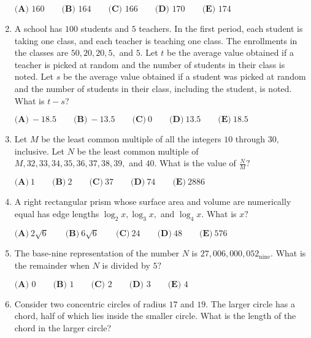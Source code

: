 \documentclass{article}
\begin{document}
\begin{enumerate}[label=\arabic*., itemsep=0.5em]
$\textbf{(A) }160\qquad\textbf{(B) }164\qquad\textbf{(C) }166\qquad\textbf{(D) }170\qquad\textbf{(E) }174$\par \vspace{0.5em}\item A school has $100$ students and $5$ teachers. In the first period, each student is taking one class, and each teacher is teaching one class. The enrollments in the classes are $50, 20, 20, 5, $ and $5$. Let $t$ be the average value obtained if a teacher is picked at random and the number of students in their class is noted. Let $s$ be the average value obtained if a student was picked at random and the number of students in their class, including the student, is noted. What is $t-s$?

$\textbf{(A)}\ {-}18.5  \qquad\textbf{(B)}\ {-}13.5 \qquad\textbf{(C)}\ 0 \qquad\textbf{(D)}\ 13.5 \qquad\textbf{(E)}\ 18.5$\par \vspace{0.5em}\item Let $M$ be the least common multiple of all the integers $10$ through $30,$ inclusive. Let $N$ be the least common multiple of $M,32,33,34,35,36,37,38,39,$ and $40.$ What is the value of $\frac{N}{M}?$

$\textbf{(A)}\ 1 \qquad\textbf{(B)}\ 2 \qquad\textbf{(C)}\ 37 \qquad\textbf{(D)}\ 74 \qquad\textbf{(E)}\ 2886$\par \vspace{0.5em}\item A right rectangular prism whose surface area and volume are numerically equal has edge lengths $\log_{2}x, \log_{3}x,$ and $\log_{4}x.$ What is $x?$

$\textbf{(A)}\ 2\sqrt{6} \qquad\textbf{(B)}\ 6\sqrt{6} \qquad\textbf{(C)}\ 24 \qquad\textbf{(D)}\ 48 \qquad\textbf{(E)}\ 576$\par \vspace{0.5em}\item The base-nine representation of the number $N$ is $27{,}006{,}000{,}052_{\text{nine}}.$ What is the remainder when $N$ is divided by $5?$

$\textbf{(A) } 0\qquad\textbf{(B) } 1\qquad\textbf{(C) } 2\qquad\textbf{(D) } 3\qquad\textbf{(E) }4$\par \vspace{0.5em}\item Consider two concentric circles of radius $17$ and $19.$ The larger circle has a chord, half of which lies inside the smaller circle. What is the length of the chord in the larger circle?


\end{enumerate}
\end{document}
